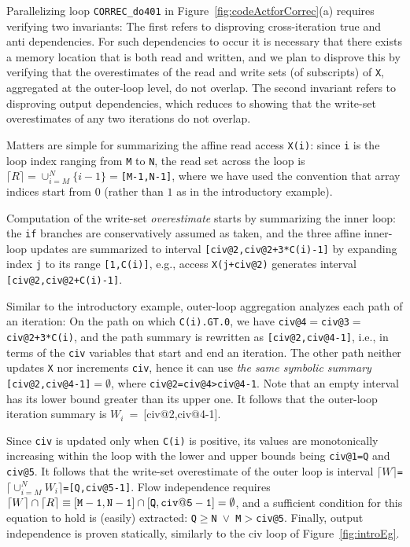 \documentclass[10pt,nocopyrightspace]{sigplanconf}
\begin{document}
Parallelizing loop {\tt CORREC\_do401} in Figure~\ref{fig:codeActforCorrec}(a)
requires verifying two invariants: The first refers to disproving 
cross-iteration true and anti dependencies. For such dependencies to occur it 
is necessary that there exists a memory location that is both read and written,
and we plan to disprove this by verifying that the overestimates of the read 
and write sets (of subscripts) of {\tt X}, aggregated at the outer-loop level, 
do not overlap. 
%
The second invariant refers to disproving output dependencies, which reduces to 
showing that the write-set overestimates of any two iterations do not overlap. 

Matters are simple for summarizing the affine 
read access {\tt X(i)}: since {\tt i} is the loop index ranging from {\tt M} to {\tt N}, the
read set across the loop is  {\tt$\lceil R \rceil =\cup_{i=M}^{N}\{i-1\}=$[M-1,N-1]},
where we have used the convention that array indices start from $0$ 
(rather than $1$ as in the introductory example). 

Computation of the write-set {\em overestimate} starts by summarizing 
the inner loop: the {\tt if} branches are conservatively assumed as taken, 
and  the three affine inner-loop updates  are summarized to interval
{\tt[civ@2,civ@2+3*C(i)-1]} by expanding index {\tt j} to its range 
{\tt [1,C(i)]}, e.g., access {\tt X(j+civ@2)} generates interval %
{\tt[civ@2,civ@2+C(i)-1]}.   

Similar to the introductory example, outer-loop aggregation
analyzes each path of an iteration:
On the path on which {\tt C(i).GT.0}, we have 
{\tt civ@4$=$civ@3$=$civ@2+3*C(i)}, and the path summary is
rewritten as {\tt [civ@2,civ@4-1]}, i.e., in terms of the {\tt civ}
variables that start and end an iteration. The other path neither 
updates {\tt X} nor increments {\tt civ}, hence it can use
{\em the same symbolic summary} {\tt[civ@2,civ@4-1]$=\emptyset$}, where 
 {\tt{}civ@2=civ@4>civ@4-1}. Note that an empty interval has its lower 
bound greater than its upper one.
%
It follows that the outer-loop iteration summary is
{$W_i$~=~[civ@2,civ@4-1]}.

Since {\tt civ} is updated only when {\tt C(i)} is positive,
its values are monotonically increasing within the loop with
the lower and upper bounds being {\tt civ@1=Q} and {\tt civ@5}. 
It follows that the write-set overestimate of the outer loop is 
interval {\tt$\lceil W\rceil$=$\lceil \cup_{i=M}^{N}W_i\rceil$=[Q,civ@5-1]}.
Flow independence requires   
$\lceil W\rceil\cap\lceil R \rceil \equiv {\tt [M-1,N-1]}\cap{\tt{}[Q,civ@5-1]}=\emptyset$,
and a sufficient condition for this equation to hold is (easily) extracted:
{\tt Q$\ge$N $\vee$ M$>$civ@5}.
%
Finally, output independence is proven statically, similarly to the 
{\sc civ} loop of Figure~\ref{fig:introEg}.
\end{document}
